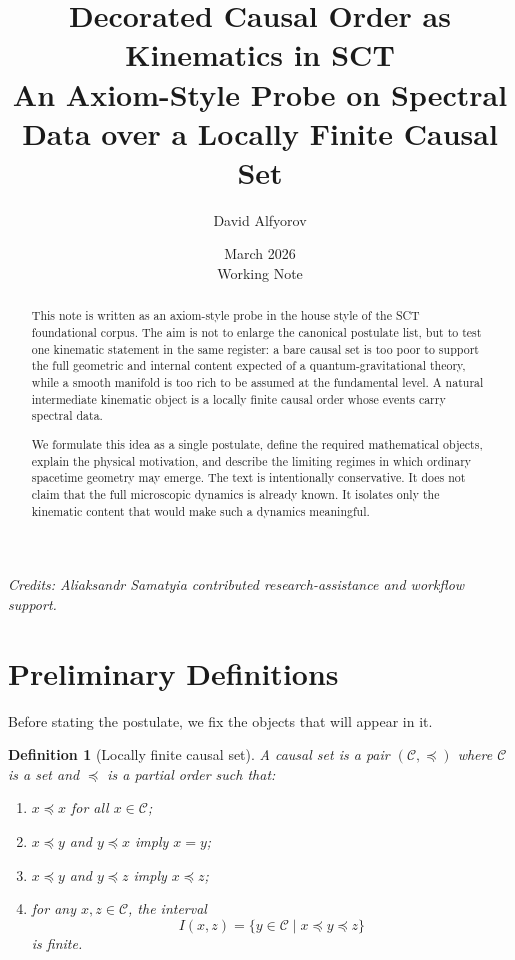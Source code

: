 \documentclass[12pt,a4paper]{article}
\title{\textbf{Decorated Causal Order as Kinematics in SCT}\\[6pt]
\large An Axiom-Style Probe on Spectral Data over a Locally Finite Causal Set}
\author{David Alfyorov}
\date{March 2026\\[4pt]\small Working Note}
\theoremstyle{postulate}
\newtheorem{definition}{Definition}[section]
\newcommand{\Causal}{\mathcal{C}}
\begin{document}
\maketitle

\begin{center}
\small\textit{Credits: Aliaksandr Samatyia contributed research-assistance and workflow support.}
\end{center}

\thispagestyle{empty}

\begin{abstract}
This note is written as an axiom-style probe in the house style of the SCT
foundational corpus.  The aim is not to enlarge the canonical postulate list,
but to test one kinematic statement in the same register: a bare causal set
is too poor to support the full geometric and internal content expected of a
quantum-gravitational theory, while a smooth manifold is too rich to be
assumed at the fundamental level.  A natural intermediate kinematic object is
a locally finite causal order whose events carry spectral data.

We formulate this idea as a single postulate, define the required
mathematical objects, explain the physical motivation, and describe the
limiting regimes in which ordinary spacetime geometry may emerge.  The text
is intentionally conservative.  It does not claim that the full microscopic
dynamics is already known.  It isolates only the kinematic content that would
make such a dynamics meaningful.
\end{abstract}

\tableofcontents
\newpage

\section{Preliminary Definitions}
\label{sec:prelim}

Before stating the postulate, we fix the objects that will appear in it.

\begin{definition}[Locally finite causal set]
A causal set is a pair $(\Causal,\preceq)$ where $\Causal$ is a set and
$\preceq$ is a partial order such that:
\begin{enumerate}[label=(\roman*)]
  \item $x \preceq x$ for all $x \in \Causal$;
  \item $x \preceq y$ and $y \preceq x$ imply $x=y$;
  \item $x \preceq y$ and $y \preceq z$ imply $x \preceq z$;
  \item for any $x,z\in\Causal$, the interval
  \[
    I(x,z)=\{y\in\Causal\mid x\preceq y\preceq z\}
  \]
  is finite.
\end{enumerate}
\end{definition}
\end{document}
